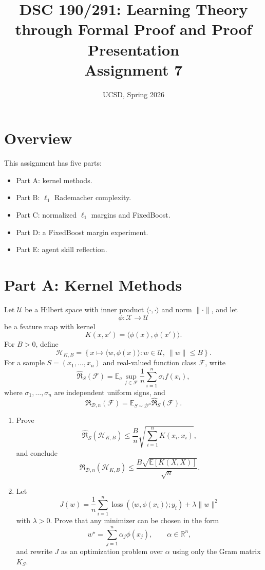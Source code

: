 \documentclass{article}
\title{DSC 190/291: Learning Theory through Formal Proof and Proof Presentation\\Assignment 7}
\date{UCSD, Spring 2026}
\begin{document}
\maketitle

\section{Overview}

This assignment has five parts:
\begin{itemize}
\item Part A: kernel methods.
\item Part B: $\ell_1$ Rademacher complexity.
\item Part C: normalized $\ell_1$ margins and FixedBoost.
\item Part D: a FixedBoost margin experiment.
\item Part E: agent skill reflection.
\end{itemize}

\section{Part A: Kernel Methods}

Let $\mathcal{U}$ be a Hilbert space with inner product $\langle \cdot,\cdot \rangle$ and norm $\|\cdot\|$, and let
$$
\phi : \mathcal{X}\to \mathcal{U}
$$
be a feature map with kernel
$$
K(x,x')=\langle \phi(x),\phi(x')\rangle.
$$
For $B>0$, define
$$
\mathcal{H}_{K,B}
=
\left\{
x \mapsto \langle w,\phi(x)\rangle
:
w\in\mathcal{U},\ \|w\|\le B
\right\}.
$$
For a sample $S=(x_1,\dots,x_n)$ and real-valued function class $\mathcal{F}$, write
$$
\widehat{\mathfrak{R}}_S(\mathcal{F})
=
\mathbb{E}_\sigma
\sup_{f\in\mathcal{F}}
\frac{1}{n}\sum_{i=1}^n \sigma_i f(x_i),
$$
where $\sigma_1,\dots,\sigma_n$ are independent uniform signs, and
$$
\mathfrak{R}_{\mathcal{D},n}(\mathcal{F})
=
\mathbb{E}_{S\sim \mathcal{D}^n}\widehat{\mathfrak{R}}_S(\mathcal{F}).
$$

\begin{enumerate}
\item Prove
$$
\widehat{\mathfrak{R}}_S(\mathcal{H}_{K,B})
\le
\frac{B}{n}\sqrt{\sum_{i=1}^n K(x_i,x_i)},
$$
and conclude
$$
\mathfrak{R}_{\mathcal{D},n}(\mathcal{H}_{K,B})
\le
\frac{B\sqrt{\mathbb{E}[K(X,X)]}}{\sqrt{n}}.
$$

\item Let
$$
J(w)
=
\frac{1}{n}\sum_{i=1}^n \operatorname{loss}(\langle w,\phi(x_i)\rangle;y_i)
+
\lambda \|w\|^2
$$
with $\lambda>0$. Prove that any minimizer can be chosen in the form
$$
w^\star = \sum_{j=1}^n \alpha_j \phi(x_j),
\qquad
\alpha \in \mathbb{R}^n,
$$
and rewrite $J$ as an optimization problem over $\alpha$ using only the Gram matrix $K_S$.
\end{enumerate}
\end{document}
